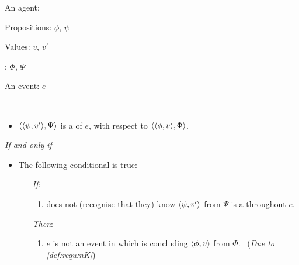 \begin{note}
  \begin{definition}[A \requ{0}]
    \label{def:requ}
    \begin{itemize*}[noitemsep, label=\(\circ\)]
    \item
      An agent: \vAgent{}
    \item
      Propositions: \(\phi\), \(\psi\)
    \item
      Values: \(v\), \(v'\)
    \item
      : \(\Phi\), \(\Psi\)
    \item
      An event: \(e\)
    \item
      \mbox{ }
    \end{itemize*}

    \begin{itemize}
    \item
      \(\langle \langle \psi, v' \rangle, \Psi \rangle\) is a \emph{\requ{}} of \(e\), with respect to \(\langle \langle \phi, v \rangle, \Phi \rangle\).
    \end{itemize}

    \emph{If and only if}

    \begin{itemize}
    \item
      The following conditional is true:
      \begin{itemize}
      \item[\emph{If}:]
        \begin{enumerate}[label=\alph*., ref=(\alph*), series=requDefSeries]
        \item
          \label{def:requ:nK}
          \vAgent{} does not (recognise that they) know \(\langle \psi, v' \rangle\) from \(\Psi\) is a \fc{} throughout \(e\).
        \end{enumerate}
      \item[\emph{Then}:]
        \begin{enumerate}[label=\alph*., ref=(\alph*), resume*=requDefSeries]
        \item
          \label{def:requ:nC}
          \(e\) is not an event in which \vAgent{} is concluding \(\langle \phi, v \rangle\) from \(\Phi\).\newline
          \mbox{ }\hfill(\emph{Due to \ref{def:requ:nK}})
        \end{enumerate}
      \end{itemize}
    \end{itemize}
    \vspace{-\baselineskip}
  \end{definition}
\end{note}

